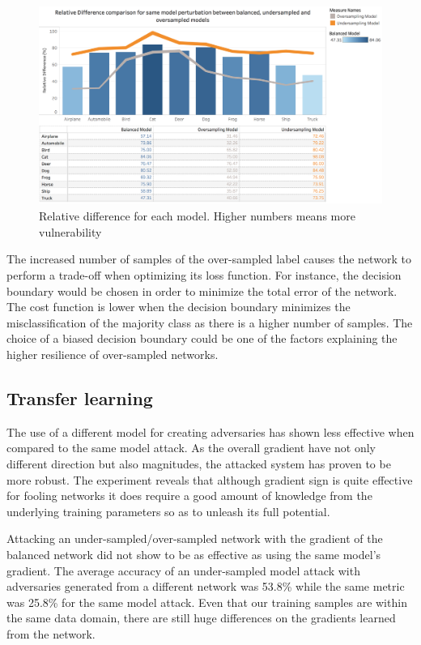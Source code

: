 \documentclass[runningheads,a4paper]{llncs}
\begin{document}
\begin{figure}
	\centering
	\includegraphics[height=6.5cm]{rel_diff_graph.png}
	\caption{Relative difference for each model. Higher numbers means more vulnerability}
	\label{fig:relative_difference}
\end{figure}


The increased number of samples of the over-sampled label causes the network to perform a trade-off when optimizing its loss function. For instance, the decision boundary would be chosen in order to minimize the total error of the network. The cost function is lower when the decision boundary minimizes the misclassification of the majority class as there is a higher number of samples. The choice of a biased decision boundary could be one of the factors explaining the higher resilience of over-sampled networks.

\subsection{Transfer learning}

The use of a different model for creating adversaries has shown less effective when compared to the same model attack. As the overall gradient have not only different direction but also magnitudes, the attacked system has proven to be more robust. The experiment reveals that although gradient sign is quite effective for fooling networks it does require a good amount of knowledge from the underlying training parameters so as to unleash its full potential. 

Attacking an under-sampled/over-sampled network with the gradient of the balanced network did not show to be as effective as using the same model's gradient. The average accuracy of an under-sampled model attack with adversaries generated from a different network was 53.8\% while the same metric was 25.8\% for the same model attack. Even that our training samples are within the same data domain, there are still huge differences on the gradients learned from the network. 
\end{document}
